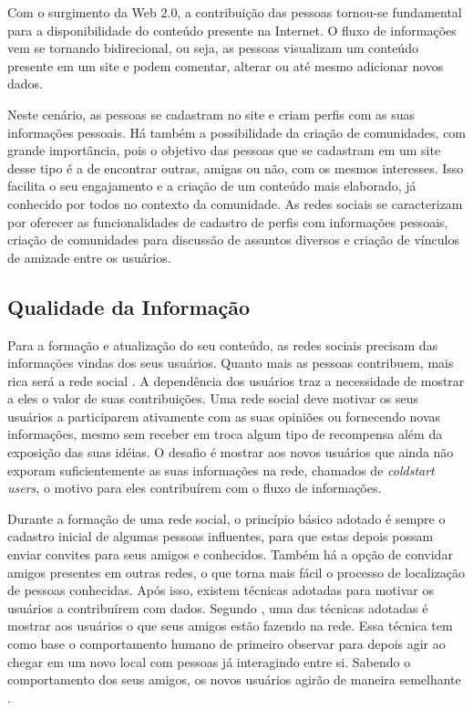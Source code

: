 Com o surgimento da Web 2.0, a contribuição das pessoas tornou-se fundamental para a disponibilidade do conteúdo presente na Internet. O fluxo de informações vem se tornando bidirecional, ou seja, as pessoas visualizam um conteúdo presente em um site e podem comentar, alterar ou até mesmo adicionar novos dados.

Neste cenário, as pessoas se cadastram no site e criam perfis com as suas informações pessoais. Há também a possibilidade da criação de comunidades, com grande importância, pois o objetivo das pessoas que se cadastram em um site desse tipo é a de encontrar outras, amigas ou não, com os mesmos interesses. Isso facilita o seu engajamento e a criação de um conteúdo mais elaborado, já conhecido por todos no contexto da comunidade. As redes sociais se caracterizam por oferecer as funcionalidades de cadastro de perfis com informações pessoais, criação de comunidades para discussão de assuntos diversos e criação de vínculos de amizade entre os usuários.

\subsection{Qualidade da Informação}

Para a formação e atualização do seu conteúdo, as redes sociais precisam das informações vindas dos seus usuários. Quanto mais as pessoas contribuem, mais rica será a rede social \cite{burke2009fmm}. A dependência dos usuários traz a necessidade de mostrar a eles o valor de suas contribuições. Uma rede social deve motivar os seus usuários a participarem ativamente com as suas opiniões ou fornecendo novas informações, mesmo sem receber em troca algum tipo de recompensa além da exposição das suas idéias. O desafio é mostrar aos novos usuários que ainda não exporam suficientemente as suas informações na rede, chamados de \textit{coldstart users}, o motivo para eles contribuírem com o fluxo de informações.

Durante a formação de uma rede social, o princípio básico adotado é sempre o cadastro inicial de algumas pessoas influentes, para que estas depois possam enviar convites para seus amigos e conhecidos. Também há a opção de convidar amigos presentes em outras redes, o que torna mais fácil o processo de localização de pessoas conhecidas. Após isso, existem técnicas adotadas para motivar os usuários a contribuírem com dados. Segundo \cite{burke2009fmm}, uma das técnicas adotadas é mostrar aos usuários o que seus amigos estão fazendo na rede. Essa técnica tem como base o comportamento humano de primeiro observar para depois agir ao chegar em um novo local com pessoas já interagindo entre si. Sabendo o comportamento dos seus amigos, os novos usuários agirão de maneira semelhante \cite{burke2009fmm}.

